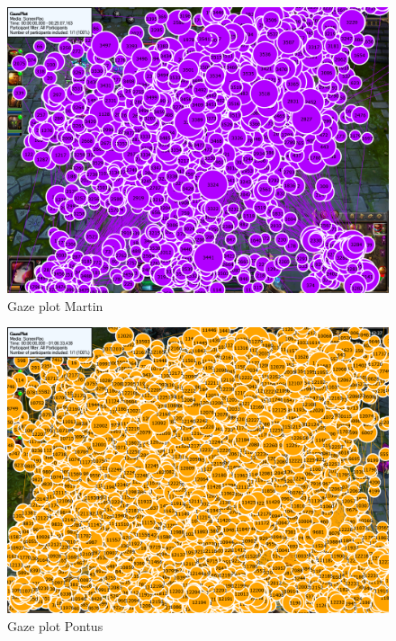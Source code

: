 \documentclass{article}
\begin{document}
\begin{figure}[h!]
\begin{center}
\includegraphics*[width=0.90\columnwidth]{images/gazeplot/Martin}
\end{center}
\caption{Gaze plot Martin}
\label{gaze_mar}
\end{figure}

\begin{figure}[h!]
\begin{center}
\includegraphics*[width=0.90\columnwidth]{images/gazeplot/Pontus}
\end{center}
\caption{Gaze plot Pontus}
\label{gaze_pon}
\end{figure}
\end{document}
